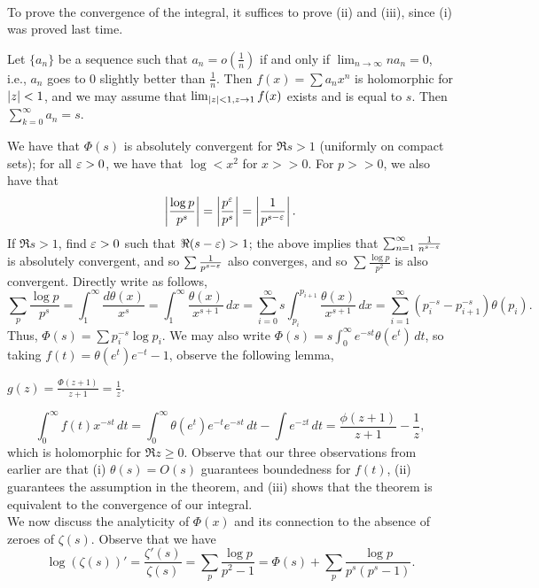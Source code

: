 \\[8pt]
To prove the convergence of the integral, it suffices to prove (ii) and (iii), since (i) was proved last time.
\begin{theorem}
    Let $\{a_n\}$ be a sequence such that $a_n = o(\frac{1}{n})$ if and only if $\lim_{n \to \infty} n a_n = 0$, i.e., $a_n$ goes to $0$ slightly better than $\frac{1}{n}$. Then $f(x) = \sum a_n x^n$ is holomorphic for $\left\lvert z \right\rvert < 1$, and we may assume that $\lim_{\left\lvert z \right\rvert < 1, z \to 1} f(x)$ exists and is equal to $s$. Then $\sum_{k=0}^\infty a_n = s$.
\end{theorem}
\noindent We have that $\Phi(s)$ is absolutely convergent for $\Re s > 1$ (uniformly on compact sets); for all $\varepsilon > 0$, we have that $\log < x^2$ for $x >\!\!> 0$. For $p >\!\!> 0 $, we also have that
\[ \left\lvert \frac{\log p}{p^s} \right\rvert = \left\lvert \frac{p^\varepsilon}{p^s} \right\rvert = \left\lvert \frac{1}{p^{s - \varepsilon}} \right\rvert. \]
If $\Re s > 1$, find $\varepsilon > 0$ such that $\Re(s - \varepsilon) > 1$; the above implies that $\sum_{n=1}^\infty \frac{1}{n^{s-\varepsilon}}$ is absolutely convergent, and so $\sum \frac{1}{p^{s-\varepsilon}}$ also converges, and so $\sum \frac{\log p}{p^2}$ is also convergent. Directly write as follows,
\[ \sum_p \frac{\log p}{p^s} = \int_1^\infty \frac{d\theta(x)}{x^s} = \int_1^\infty \frac{\theta(x)}{x^{s+1}} \, dx = \sum_{i=0}^\infty s \int_{p_i}^{p_{i+1}} \frac{\theta(x)}{x^{s+1}} \, dx = \sum_{i=1}^\infty (p_i^{-s} - p_{i+1}^{-s}) \theta(p_i). \]
Thus, $\Phi(s) = \sum p_i^{-s} \log p_i$. We may also write $\Phi(s) = s \int_0^\infty e^{-st} \theta(e^t) \, dt$, so taking $f(t) = \theta(e^t) e^{-t} - 1$, observe the following lemma,
\begin{lemma}
    $g(z) = \frac{\Phi(z + 1)}{z+1} = \frac{1}{z}$.
\end{lemma}\vspace{-8pt}
\[ \int_0^\infty f(t) x^{-st} \, dt = \int_0^\infty \theta(e^t) e^{-t} e^{-st} \, dt - \int e^{-zt} \, dt = \frac{\phi(z + 1)}{z+1} - \frac{1}{z}, \]
which is holomorphic for $\Re z \geq 0$. Observe that our three observations from earlier are that (i) $\theta(s) = O(s)$ guarantees boundedness for $f(t)$, (ii) guarantees the assumption in the theorem, and (iii) shows that the theorem is equivalent to the convergence of our integral.
\\[8pt]
We now discuss the analyticity of $\Phi(x)$ and its connection to the absence of zeroes of $\zeta(s)$. Observe that we have
\[ \log(\zeta(s))' = \frac{\zeta'(s)}{\zeta(s)} = \sum_{p} \frac{\log p}{p^2 - 1} = \Phi(s) + \sum_p \frac{\log p}{p^s(p^s - 1)}. \]
